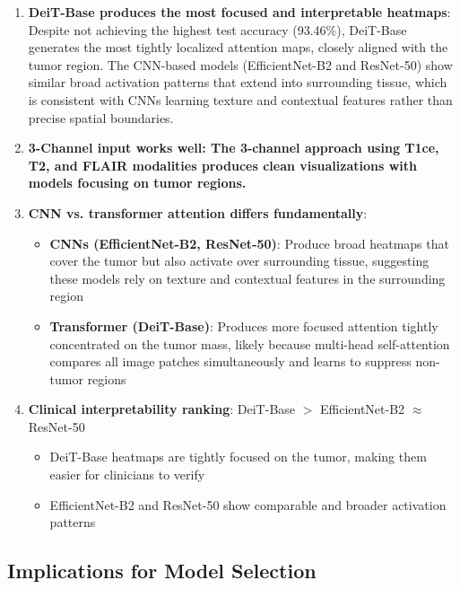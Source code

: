 \begin{enumerate}
    \item \textbf{DeiT-Base produces the most focused and interpretable heatmaps}: Despite not achieving the highest test accuracy (93.46\%), DeiT-Base generates the most tightly localized attention maps, closely aligned with the tumor region. The CNN-based models (EfficientNet-B2 and ResNet-50) show similar broad activation patterns that extend into surrounding tissue, which is consistent with CNNs learning texture and contextual features rather than precise spatial boundaries.
    
    \item \textbf{3-Channel input works well: The 3-channel approach using T1ce, T2, and FLAIR modalities produces clean visualizations with models focusing on tumor regions.}
    
    \item \textbf{CNN vs. transformer attention differs fundamentally}:
    \begin{itemize}
        \item \textbf{CNNs (EfficientNet-B2, ResNet-50)}: Produce broad heatmaps that cover the tumor but also activate over surrounding tissue, suggesting these models rely on texture and contextual features in the surrounding region
        \item \textbf{Transformer (DeiT-Base)}: Produces more focused attention tightly concentrated on the tumor mass, likely because multi-head self-attention compares all image patches simultaneously and learns to suppress non-tumor regions
    \end{itemize}
    
    \item \textbf{Clinical interpretability ranking}: DeiT-Base $>$ EfficientNet-B2 $\approx$ ResNet-50
    \begin{itemize}
        \item DeiT-Base heatmaps are tightly focused on the tumor, making them easier for clinicians to verify
        \item EfficientNet-B2 and ResNet-50 show comparable and broader activation patterns
    \end{itemize}
\end{enumerate}

\subsection{Implications for Model Selection}

